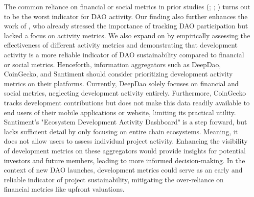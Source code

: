 The common reliance on financial or social metrics in prior studies (\cite{Lee_2024}; \cite{faqir2021comparative}; \cite{monteiro2024exploring}) turns out to be the worst indicator for DAO activity. 
Our finding also further enhances the work of \textcite{arroyo2022dao}, who already stressed the importance of tracking DAO participation but lacked a focus on activity metrics. 
We also expand on \textcite{liu2021technology} by empirically assessing the effectiveness of different activity metrics and demonstrating that development activity is a more reliable indicator of DAO sustainability compared to financial or social metrics. 
Henceforth, information aggregators such as DeepDao, CoinGecko, and Santiment should consider prioritizing development activity metrics on their platforms.
Currently, DeepDao solely focuses on financial and social metrics, neglecting development activity entirely.
Furthermore, CoinGecko tracks development contributions but does not make this data readily available to end users of their mobile applications or website, limiting its practical utility. 
Santiment’s "Ecosystem Development Activity Dashboard" is a step forward, but lacks sufficient detail by only focusing on entire chain ecosystems. Meaning, it does not allow users to assess individual project activity.
Enhancing the visibility of development metrics on these aggregators would provide insights for potential investors and future members, leading to more informed decision-making.
In the context of new DAO launches, development metrics could serve as an early and reliable indicator of project sustainability, mitigating the over-reliance on financial metrics like upfront valuations.

